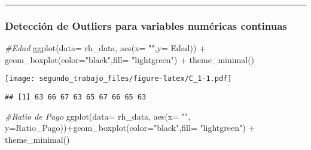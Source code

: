 \documentclass[
]{article}
\newenvironment{Shaded}{\begin{snugshade}}{\end{snugshade}}
\newcommand{\AttributeTok}[1]{\textcolor[rgb]{0.77,0.63,0.00}{#1}}
\newcommand{\CommentTok}[1]{\textcolor[rgb]{0.56,0.35,0.01}{\textit{#1}}}
\newcommand{\FunctionTok}[1]{\textcolor[rgb]{0.00,0.00,0.00}{#1}}
\newcommand{\NormalTok}[1]{#1}
\newcommand{\SpecialCharTok}[1]{\textcolor[rgb]{0.00,0.00,0.00}{#1}}
\newcommand{\StringTok}[1]{\textcolor[rgb]{0.31,0.60,0.02}{#1}}
\begin{document}
\begin{center}\rule{0.5\linewidth}{0.5pt}\end{center}

\hypertarget{detecciuxf3n-de-outliers-para-variables-numuxe9ricas-continuas}{%
\subsubsection{Detección de Outliers para variables numéricas
continuas}\label{detecciuxf3n-de-outliers-para-variables-numuxe9ricas-continuas}}

\begin{Shaded}
\begin{Highlighting}[]
\CommentTok{\#Edad}
\FunctionTok{ggplot}\NormalTok{(}\AttributeTok{data=}\NormalTok{ rh\_data, }\FunctionTok{aes}\NormalTok{(}\AttributeTok{x=} \StringTok{""}\NormalTok{,}\AttributeTok{y=}\NormalTok{ Edad)) }\SpecialCharTok{+} \FunctionTok{geom\_boxplot}\NormalTok{(}\AttributeTok{color=}\StringTok{"black"}\NormalTok{,}\AttributeTok{fill=} \StringTok{"lightgreen"}\NormalTok{) }\SpecialCharTok{+} 
\FunctionTok{theme\_minimal}\NormalTok{()}
\end{Highlighting}
\end{Shaded}

\texttt{[image: segundo\_trabajo\_files/figure-latex/C\_1-1.pdf]}

\begin{Shaded}
\end{Shaded}

\begin{verbatim}
## [1] 63 66 67 63 65 67 66 65 63
\end{verbatim}

\begin{Shaded}
\begin{Highlighting}[]
\CommentTok{\#Ratio de Pago}
\FunctionTok{ggplot}\NormalTok{(}\AttributeTok{data=}\NormalTok{ rh\_data, }\FunctionTok{aes}\NormalTok{(}\AttributeTok{x=} \StringTok{""}\NormalTok{, }\AttributeTok{y=}\NormalTok{Ratio\_Pago))}\SpecialCharTok{+}\FunctionTok{geom\_boxplot}\NormalTok{(}\AttributeTok{color=}\StringTok{"black"}\NormalTok{,}\AttributeTok{fill=} \StringTok{"lightgreen"}\NormalTok{) }\SpecialCharTok{+} 
\FunctionTok{theme\_minimal}\NormalTok{()}
\end{Highlighting}
\end{Shaded}
\end{document}

